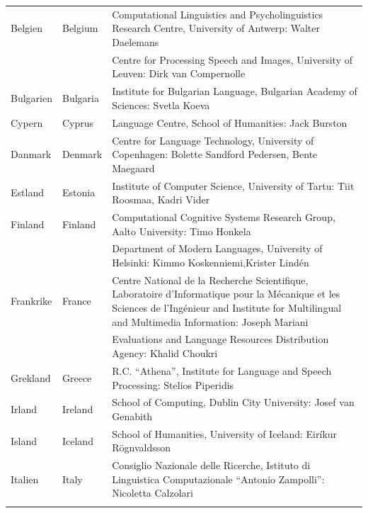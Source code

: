 \small
\begin{longtable}{llp{113mm}}
  Belgien & \textcolor{grey1}{Belgium} & Computational Linguistics and Psycholinguistics Research Centre, University of Antwerp: Walter Daelemans\\ \addlinespace
  & & Centre for Processing Speech and Images, University of Leuven: Dirk van Compernolle \\ \addlinespace
  Bulgarien & \textcolor{grey1}{Bulgaria} & Institute for Bulgarian Language, Bulgarian Academy of Sciences: Svetla Koeva \\ \addlinespace
  Cypern &  \textcolor{grey1}{Cyprus} & Language Centre, School of Humanities: Jack Burston\\ \addlinespace
  Danmark &  \textcolor{grey1}{Denmark} & Centre for Language Technology, University of Copenhagen: \newline Bolette Sandford Pedersen, Bente Maegaard\\ \addlinespace
  Estland & \textcolor{grey1}{Estonia} & Institute of Computer Science, University of Tartu: Tiit Roosmaa, Kadri Vider\\ \addlinespace
  Finland & \textcolor{grey1}{Finland} & Computational Cognitive Systems Research Group, Aalto University: Timo Honkela\\ \addlinespace
  & & Department of Modern Languages, University of Helsinki: Kimmo Koskenniemi,\newline Krister Lindén \\ \addlinespace
  Frankrike & \textcolor{grey1}{France} & Centre National de la Recherche Scientifique, Laboratoire d'Informatique pour la Mécanique et les Sciences de l'Ingénieur and Institute for Multilingual and Multimedia Information: Joseph Mariani \\ \addlinespace
  & & Evaluations and Language Resources Distribution Agency: Khalid Choukri\\ \addlinespace
  Grekland & \textcolor{grey1}{Greece} & R.C. “Athena”, Institute for
  Language and Speech Processing: Stelios Piperidis\\ \addlinespace
  Irland & \textcolor{grey1}{Ireland} & School of Computing, Dublin City University: Josef van Genabith\\ \addlinespace
  Island & \textcolor{grey1}{Iceland} & School of Humanities, University of Iceland: Eiríkur Rögnvaldsson\\ \addlinespace
  Italien & \textcolor{grey1}{Italy} & Consiglio Nazionale delle Ricerche, Istituto di Linguistica Computazionale “Antonio Zampolli”: Nicoletta Calzolari\\ \addlinespace

\end{longtable}
